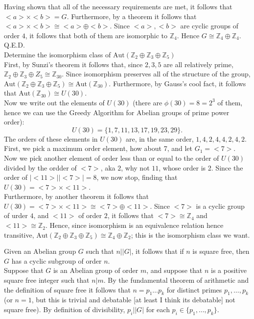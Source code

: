 \documentclass{article}
\newcommand{\Aut}{\mbox{Aut}}
\newcommand{\Z}{\mathbb{Z}}
\begin{document}
Having shown that all of the necessary requirements are met, it follows that $<a>\times <b> = G$. Furthermore, by a theorem it follows that $<a>\times <b>\cong <a>\oplus<b>$. Since $<a>,<b>$ are cyclic groups of order $4$, it follows that both of them are isomorphic to $\Z_4$. Hence $G\cong \Z_4\oplus\Z_4$. Q.E.D.\\

 Determine the isomorphism class of $\Aut(\Z_2\oplus \Z_3\oplus \Z_5)$\\

 First, by Sunzi's theorem it follows that, since $2,3,5$ are all relatively prime, $\Z_2\oplus \Z_3\oplus Z_5\cong \Z_{30}$. Since isomorphism preserves all of the structure of the group, $\Aut(\Z_2\oplus\Z_3\oplus\Z_5) \cong \Aut(\Z_{30})$. Furthermore, by Gauss's cool fact, it follows that $\Aut(\Z_{30}) \cong U(30)$.\\

Now we write out the elements of $U(30)$ (there are $\phi(30) = 8 = 2^3$ of them, hence we can use the Greedy Algorithm for Abelian groups of prime power order):
$$U(30) = \{1,7,11,13,17,19,23,29\}.$$ The orders of these elements in $U(30)$ are, in the same order, $1,4,2,4,4,2,4,2$. First, we pick a maximum order element, how about 7, and let $G_1 = <7>$. Now we pick another element of order less than or equal to the order of $U(30)$ divided by the ordder of $<7>$, aka $2$, why not $11$, whose order is 2. Since the order of $|<11>||<7>| = 8$, we now stop, finding that $U(30)= <7>\times <11>$.\\
Furthermore, by another theorem it follows that $U(30) = <7>\times <11> \cong <7>\oplus <11>$. Since $<7>$ is a cyclic group of urder $4$, and $<11>$ of order $2$, it follows that $<7>\cong \Z_4$ and $<11>\cong \Z_2$. Hence, since isomorphism is an equivalence relation hence transitive, $\Aut(\Z_2\oplus\Z_3\oplus\Z_5)\cong \Z_4\oplus\Z_2$; this is the isomorphism class we want.\\


\newpage

 Given an Abelian group $G$ such that $n\big| |G|$, it follows that if $n$ is square free, then $G$ has a cyclic subgroup of order $n$.\\

Suppose that $G$ is an Abelian group of order $m$, and suppose that $n$ is a positive square free integer such that $n|m$. By the fundamental theorem of arithmetic and the definition of square free it follows that $n = p_1\dots p_k$ for distinct primes $p_1,\dots,p_k$ (or $n = 1$, but this is trivial and debatable [at least I think its debatable] not square free). By definition of divisibility, $p_i\big||G|$ for each $p_i\in \{p_1,\dots,p_k\}$. \\
\end{document}
